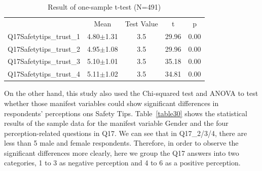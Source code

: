 \begin{table}[h]
  \caption[Result of one-sample t-test]{Result of one-sample t-test (N=491)}
  \label{table29}
  \centering
  \begin{tabular}{l|cccc}
 \hline
                  & Mean                 & Test Value & t                          & p                        \\
Q17Safetytips\_trust\_1 & 4.80$\pm$1.31            & 3.5                            & 29.96 & 0.00 \\
Q17Safetytips\_trust\_2 & 4.95$\pm$1.08            & 3.5                            & 29.96 & 0.00 \\
Q17Safetytips\_trust\_3 & 5.10$\pm$1.01            & 3.5                            & 35.18 & 0.00 \\
Q17Safetytips\_trust\_4 & 5.11$\pm$1.02            & 3.5                            & 34.81 & 0.00 \\
 \hline
  \end{tabular}
\end{table}

On the other hand, this study also used the Chi-squared test and ANOVA to test whether those manifest variables could show significant differences in respondents' perceptions ons Safety Tips. Table~\ref{table30} shows the statistical results of the sample data for the manifest variable Gender and the four perception-related questions in Q17. We can see that in Q17\_2/3/4, there are less than 5 male and female respondents. Therefore, in order to observe the significant differences more clearly, here we group the Q17 answers into two categories, 1 to 3 as negative perception and 4 to 6 as a positive perception.

